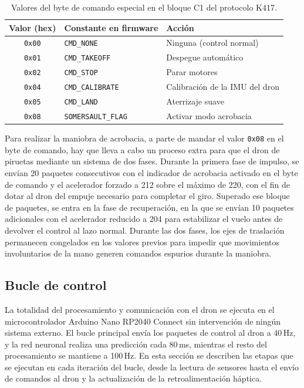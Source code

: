 \documentclass[12pt]{article}
\begin{document}
\begin{table}[htbp]
\centering
\caption{Valores del byte de comando especial en el bloque C1 del protocolo K417.}
\label{tab:pkt_comandos}
\begin{tabular}{cll}
\hline
\textbf{Valor (hex)} & \textbf{Constante en firmware} & \textbf{Acción} \\
\hline
\texttt{0x00} & \texttt{CMD\_NONE}        & Ninguna (control normal)    \\
\texttt{0x01} & \texttt{CMD\_TAKEOFF}     & Despegue automático         \\
\texttt{0x02} & \texttt{CMD\_STOP}        & Parar motores   \\
\texttt{0x04} & \texttt{CMD\_CALIBRATE}   & Calibración de la IMU del dron \\
\texttt{0x05} & \texttt{CMD\_LAND}     & Aterrizaje suave              \\
\texttt{0x08} & \texttt{SOMERSAULT\_FLAG} & Activar modo acrobacia \\
\hline
\end{tabular}
\end{table}

Para realizar la maniobra de acrobacia, a parte de mandar el valor \texttt{0x08} en el byte de comando, hay que lleva a cabo un proceso extra para que el dron de piruetas mediante un sistema de dos fases. Durante la primera fase de impulso, se envían 20 paquetes consecutivos con el indicador de acrobacia activado en el byte de comando y el acelerador forzado a 212 sobre el máximo de 220, con el fin de dotar al dron del empuje necesario para completar el giro. Superado ese bloque de paquetes, se entra en la fase de recuperación, en la que se envían 10 paquetes adicionales con el acelerador reducido a 204 para estabilizar el vuelo antes de devolver el control al lazo normal. Durante las dos fases, los ejes de traslación permanecen congelados en los valores previos para impedir que movimientos involuntarios de la mano generen comandos espurios durante la maniobra.
\subsection{Bucle de control}
\label{sec:dron_bucle}

La totalidad del procesamiento y comunicación con el dron se ejecuta en el microcontrolador Arduino Nano RP2040 Connect sin intervención de ningún sistema externo. El bucle principal envía los paquetes de control al dron a 40\,Hz, y la red neuronal realiza una predicción cada 80\,ms, mientras el resto del procesamiento se mantiene a 100\,Hz. En esta sección se describen las etapas que se ejecutan en cada iteración del bucle, desde la lectura de sensores hasta el envío de comandos al dron y la actualización de la retroalimentación háptica.
\end{document}

